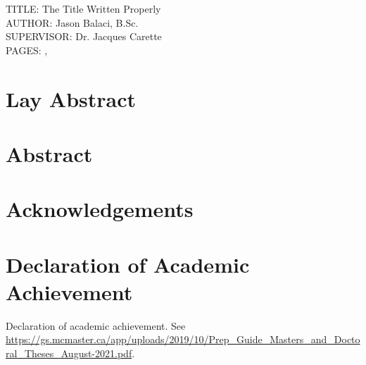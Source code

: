 \documentclass[12pt,oneside]{book}
\begin{document}
\vspace{2cm}

\noindent
TITLE: The Title Written Properly \\
AUTHOR: Jason Balaci, B.Sc. \\
SUPERVISOR: Dr. Jacques Carette \\
PAGES: \pageref{lastOfFrontMatter}, \pageref{LastPage}

\newpage


\chapter*{Lay Abstract}



\chapter{Abstract}



\chapter{Acknowledgements}




\tableofcontents


\chapter{Declaration of Academic Achievement}
\noindent
Declaration of academic achievement. See
\url{https://gs.mcmaster.ca/app/uploads/2019/10/Prep_Guide_Masters_and_Doctoral_Theses_August-2021.pdf}.
\end{document}
